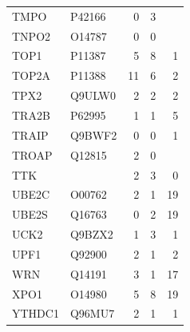 \begin{longtable}{llrrr}
TMPO & P42166 & 0 & 3 &  \\
TNPO2 & O14787 & 0 & 0 &  \\
TOP1 & P11387 & 5 & 8 & 1 \\
TOP2A & P11388 & 11 & 6 & 2 \\
TPX2 & Q9ULW0 & 2 & 2 & 2 \\
TRA2B & P62995 & 1 & 1 & 5 \\
TRAIP & Q9BWF2 & 0 & 0 & 1 \\
TROAP & Q12815 & 2 & 0 &  \\
TTK &  & 2 & 3 & 0 \\
UBE2C & O00762 & 2 & 1 & 19 \\
UBE2S & Q16763 & 0 & 2 & 19 \\
UCK2 & Q9BZX2 & 1 & 3 & 1 \\
UPF1 & Q92900 & 2 & 1 & 2 \\
WRN & Q14191 & 3 & 1 & 17 \\
XPO1 & O14980 & 5 & 8 & 19 \\
YTHDC1 & Q96MU7 & 2 & 1 & 1 \\
\hline\hline\end{longtable}
